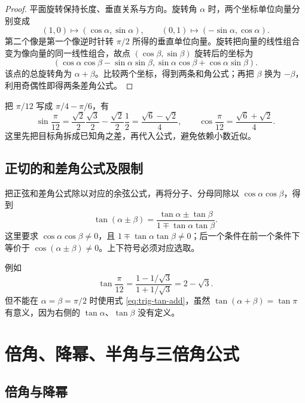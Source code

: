\documentclass[UTF8]{ctexart}
\begin{document}
\begin{proof}
平面旋转保持长度、垂直关系与方向。旋转角 $\alpha$ 时，两个坐标单位向量分别变成
\[
  (1,0)\longmapsto(\cos\alpha,\sin\alpha),\qquad
  (0,1)\longmapsto(-\sin\alpha,\cos\alpha).
\]
第二个像是第一个像逆时针转 $\pi/2$ 所得的垂直单位向量。旋转把向量的线性组合变为像向量的同一线性组合，故点 $(\cos\beta,\sin\beta)$ 旋转后的坐标为
\[
  (\cos\alpha\cos\beta-\sin\alpha\sin\beta,
    \sin\alpha\cos\beta+\cos\alpha\sin\beta).
\]
该点的总旋转角为 $\alpha+\beta$。比较两个坐标，得到两条和角公式；再把 $\beta$ 换为 $-\beta$，利用奇偶性即得两条差角公式。
\end{proof}

\begin{example}[求非基本特殊角的精确值]
把 $\pi/12$ 写成 $\pi/4-\pi/6$，有
\[
  \sin\frac\pi{12}
  =\frac{\sqrt2}{2}\frac{\sqrt3}{2}
   -\frac{\sqrt2}{2}\frac12
  =\frac{\sqrt6-\sqrt2}{4},\qquad
  \cos\frac\pi{12}=\frac{\sqrt6+\sqrt2}{4}.
\]
这里先把目标角拆成已知角之差，再代入公式，避免依赖小数近似。
\end{example}

\subsection{正切的和差角公式及限制}

把正弦和差角公式除以对应的余弦公式，再将分子、分母同除以 $\cos\alpha\cos\beta$，得到
\begin{equation}\label{eq:trig-tan-add}
  \boxed{\tan(\alpha\pm\beta)
  =\frac{\tan\alpha\pm\tan\beta}{1\mp\tan\alpha\tan\beta}}.
\end{equation}
这里要求 $\cos\alpha\cos\beta\ne0$，且 $1\mp\tan\alpha\tan\beta\ne0$；后一个条件在前一个条件下等价于 $\cos(\alpha\pm\beta)\ne0$。上下符号必须对应选取。

例如
\[
  \tan\frac\pi{12}
  =\frac{1-1/\sqrt3}{1+1/\sqrt3}=2-\sqrt3.
\]
但不能在 $\alpha=\beta=\pi/2$ 时使用式 \eqref{eq:trig-tan-add}，虽然 $\tan(\alpha+\beta)=\tan\pi$ 有意义，因为右侧的 $\tan\alpha$、$\tan\beta$ 没有定义。

\section{倍角、降幂、半角与三倍角公式}
\label{sec:trig-multiple}

\subsection{倍角与降幂}
\end{document}

